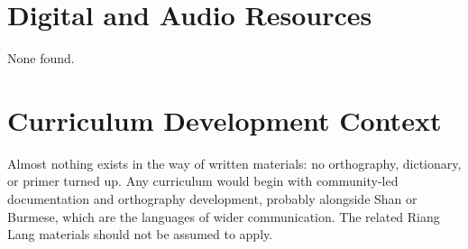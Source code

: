 \documentclass[12pt]{article}
\begin{document}
\section{Digital and Audio Resources}
None found.

\section{Curriculum Development Context}
Almost nothing exists in the way of written materials: no orthography, dictionary, or primer turned up. Any curriculum would begin with community-led documentation and orthography development, probably alongside Shan or Burmese, which are the languages of wider communication. The related Riang Lang materials should not be assumed to apply.
\end{document}
